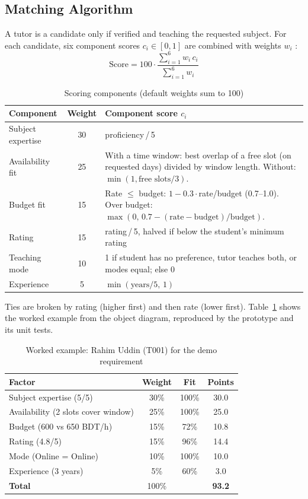 \documentclass[11pt,a4paper]{article}
\begin{document}
\subsection{Matching Algorithm}
A tutor is a candidate only if verified and teaching the requested subject. For each candidate, six component scores $c_i\in[0,1]$ are combined with weights $w_i$ \cite{triantaphyllou2000}:
\[
\text{Score} = 100\cdot\frac{\sum_{i=1}^{6} w_i\,c_i}{\sum_{i=1}^{6} w_i}
\]
\begin{table}[H]
\centering
\caption{Scoring components (default weights sum to 100)}
\small
\begin{tabularx}{\linewidth}{@{}l c X@{}}
\toprule
\textbf{Component} & \textbf{Weight} & \textbf{Component score $c_i$}\\ \midrule
Subject expertise & 30 & proficiency\,/\,5\\
Availability fit & 25 & With a time window: best overlap of a free slot (on requested days) divided by window length. Without: $\min(1,\text{free slots}/3)$.\\
Budget fit & 15 & Rate $\le$ budget: $1-0.3\cdot$rate/budget (0.7--1.0). Over budget: $\max(0,\,0.7-(\text{rate}-\text{budget})/\text{budget})$.\\
Rating & 15 & rating\,/\,5, halved if below the student's minimum rating\\
Teaching mode & 10 & 1 if student has no preference, tutor teaches both, or modes equal; else 0\\
Experience & 5 & $\min(\text{years}/5,\,1)$\\
\bottomrule
\end{tabularx}
\end{table}
Ties are broken by rating (higher first) and then rate (lower first). Table~\ref{tab:worked} shows the worked example from the object diagram, reproduced by the prototype and its unit tests.
\begin{table}[H]
\centering
\caption{Worked example: Rahim Uddin (T001) for the demo requirement}\label{tab:worked}
\small
\begin{tabular}{@{}lccc@{}}
\toprule
\textbf{Factor} & \textbf{Weight} & \textbf{Fit} & \textbf{Points}\\ \midrule
Subject expertise (5/5) & 30\% & 100\% & 30.0\\
Availability (2 slots cover window) & 25\% & 100\% & 25.0\\
Budget (600 vs 650 BDT/h) & 15\% & 72\% & 10.8\\
Rating (4.8/5) & 15\% & 96\% & 14.4\\
Mode (Online = Online) & 10\% & 100\% & 10.0\\
Experience (3 years) & 5\% & 60\% & 3.0\\ \midrule
\textbf{Total} & 100\% & & \textbf{93.2}\\
\bottomrule
\end{tabular}
\end{table}
\end{document}
